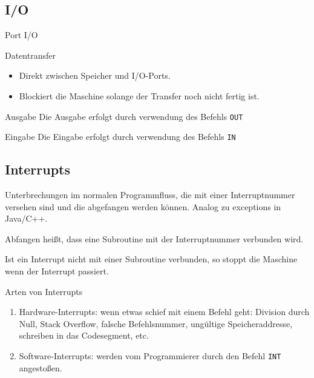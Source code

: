 \subsection{I/O}

\begin{frame}{Port I/O}
   \begin{center}
  
 \end{center}
\end{frame}


\begin{frame}{Datentransfer}
 \begin{itemize}
   \item Direkt zwischen Speicher und I/O-Ports.
   \item Blockiert die Maschine solange der Transfer noch nicht fertig ist.
 \end{itemize}
\end{frame}


\begin{frame}{Ausgabe}
 Die Ausgabe erfolgt durch verwendung des Befehls \texttt{OUT}
 \begin{center}
  
 \end{center}
\end{frame}


\begin{frame}{Eingabe}
 Die Eingabe erfolgt durch verwendung des Befehls \texttt{IN}
 \begin{center}
  
 \end{center}
\end{frame}


\subsection{Interrupts}

\begin{frame}{\insertsubsection}
 Unterbrechungen im normalen Programmfluss, die mit einer Interruptnummer
 versehen sind und die abgefangen werden können. 
 Analog zu \glqq exceptions\grqq{} in Java/C++.
 
 Abfangen heißt, dass eine Subroutine mit der Interruptnummer verbunden wird.
 
 Ist ein Interrupt nicht mit einer Subroutine verbunden, so stoppt die Maschine
 wenn der Interrupt passiert.
\end{frame}



\begin{frame}{Arten von Interrupts}
 \begin{enumerate}
  \item Hardware-Interrupts: wenn etwas schief mit einem Befehl geht:
        Division durch Null, Stack Overflow, falsche Befehlsnummer, ungültige
        Speicheraddresse, schreiben in das Codesegment, etc.
  \item Software-Interrupts: werden vom Programmierer durch den Befehl 
        \texttt{INT} angestoßen.
 \end{enumerate}
\end{frame}


